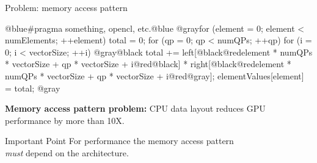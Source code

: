 
\begin{frame}[fragile]{Problem: memory access pattern}

  \begin{code}[keywords={}]
@blue#pragma something, opencl, etc.@blue
@grayfor (element = 0; element < numElements; ++element) {
  total = 0;
  for (qp = 0; qp < numQPs; ++qp) {
    for (i = 0; i < vectorSize; ++i) {
@gray@black      total +=
        left[@black@redelement * numQPs * vectorSize +
             qp * vectorSize + i@red@black] *
        right[@black@redelement * numQPs * vectorSize +
              qp * vectorSize + i@red@gray];
    }
  }
  elementValues[element] = total;
}@gray
  \end{code}

  \pause
  \vspace{-2pt}

  \textbf{Memory access pattern problem:} CPU data layout reduces GPU performance by more than 10X.

  \pause
  \vspace{-3pt}

  \begin{block}{Important Point}
    For performance the memory access pattern
    \\  \emph{must} depend on the architecture.
  \end{block}

  \vspace{5pt}

\end{frame}


